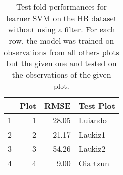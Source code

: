 \begin{table}[ht!]
\centering
\caption{Test fold performances for learner SVM on the HR dataset without using a filter. For each row, the model was trained on observations from all others plots but the given one and tested on the observations of the given plot.} 
\label{tab:svm-single-fold-perf}
\begin{tabular}{rrrl}
  \hline
 & Plot & RMSE & Test Plot \\ 
  \hline
1 &   1 & 28.05 & Luiando \\ 
  2 &   2 & 21.17 & Laukiz1 \\ 
  3 &   3 & 54.26 & Laukiz2 \\ 
  4 &   4 & 9.00 & Oiartzun \\ 
   \hline
\end{tabular}
\end{table}
